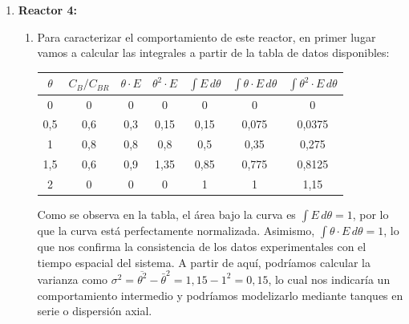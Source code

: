 \begin{enumerate}
\begin{enumerate}[label={\alph*)}]
		            \begin{equation}
			            \tau = \frac{C_{A0}\cdot X_{AR}}{k\cdot C_{A0}(1-X_{AR})}
		            \end{equation}
	      \end{enumerate}
	      \newpage
	\item \textbf{Reactor 4:}
	      \begin{enumerate}[label={\alph*)}]
		      \item Para caracterizar el comportamiento de este reactor, en primer lugar vamos a calcular las integrales a partir de la tabla de datos disponibles:
		            \begin{center}
			            \begin{tabular}{|c|c|c|c|c|c|c|}
				            \hline
				            $\theta$ & $C_B/C_{BR}$ & $\theta \cdot E$ & $\theta^2 \cdot E$ & $\int E \, d\theta$ & $\int \theta \cdot E \, d\theta$ & $\int \theta^2 \cdot E \, d\theta$ \\ \hline
				            0        & 0            & 0                & 0                  & 0                   & 0                                & 0                                  \\ \hline
				            0,5      & 0,6          & 0,3              & 0,15               & 0,15                & 0,075                            & 0,0375                             \\ \hline
				            1        & 0,8          & 0,8              & 0,8                & 0,5                 & 0,35                             & 0,275                              \\ \hline
				            1,5      & 0,6          & 0,9              & 1,35               & 0,85                & 0,775                            & 0,8125                             \\ \hline
				            2        & 0            & 0                & 0                  & 1                   & 1                                & 1,15                               \\ \hline
			            \end{tabular}
		            \end{center}
		            Como se observa en la tabla, el área bajo la curva es $\int E \, d\theta = 1$, por lo que la curva está perfectamente normalizada. Asimismo, $\int \theta \cdot E \, d\theta = 1$, lo que nos confirma la consistencia de los datos experimentales con el tiempo espacial del sistema. A partir de aquí, podríamos calcular la varianza como $\sigma^2 = \overline{\theta^2} - \bar{\theta}^2 = 1,15 - 1^2 = 0,15$, lo cual nos indicaría un comportamiento intermedio y podríamos modelizarlo mediante tanques en serie o dispersión axial.
	      \end{enumerate}


\end{enumerate}
